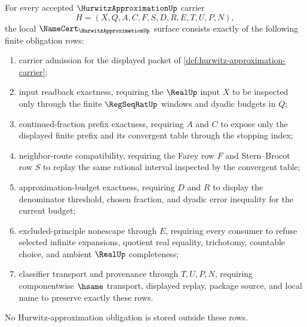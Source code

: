 
\begin{theorem}
\label{thm:hurwitz-approximation-namecert-obligations}
For every accepted $\HurwitzApproximationUp$ carrier
$$
H=(X,Q,A,C,F,S,D,R,E,T,U,P,N),
$$
the local $\NameCert_{\HurwitzApproximationUp}$ surface consists exactly of the following finite obligation rows:
\begin{enumerate}
\item carrier admission for the displayed packet of \autoref{def:hurwitz-approximation-carrier};
\item input readback exactness, requiring the $\RealUp$ input $X$ to be inspected only through the finite $\RegSeqRatUp$ windows and dyadic budgets in $Q$;
\item continued-fraction prefix exactness, requiring $A$ and $C$ to expose only the displayed finite prefix and its convergent table through the stopping index;
\item neighbor-route compatibility, requiring the Farey row $F$ and Stern--Brocot row $S$ to replay the same rational interval inspected by the convergent table;
\item approximation-budget exactness, requiring $D$ and $R$ to display the denominator threshold, chosen fraction, and dyadic error inequality for the current budget;
\item excluded-principle nonescape through $E$, requiring every consumer to refuse selected infinite expansions, quotient real equality, trichotomy, countable choice, and ambient $\RealUp$ completeness;
\item classifier transport and provenance through $T,U,P,N$, requiring componentwise $\hsame$ transport, displayed replay, package source, and local name to preserve exactly these rows.
\end{enumerate}
No Hurwitz-approximation obligation is stored outside these rows.
\end{theorem}
